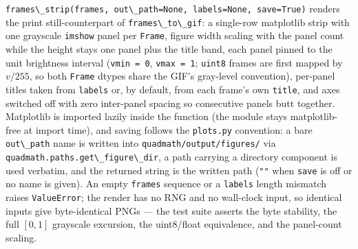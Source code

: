 \documentclass[
  10pt,
]{article}
\newcommand{\passthrough}[1]{#1}
\begin{document}
\passthrough{\lstinline!frames\_strip(frames, out\_path=None, labels=None, save=True)!}
renders the print still-counterpart of
\passthrough{\lstinline!frames\_to\_gif!}: a single-row matplotlib strip
with one grayscale \passthrough{\lstinline!imshow!} panel per
\passthrough{\lstinline!Frame!}, figure width scaling with the panel
count while the height stays one panel plus the title band, each panel
pinned to the unit brightness interval
(\passthrough{\lstinline!vmin = 0!}, \passthrough{\lstinline!vmax = 1!};
\passthrough{\lstinline!uint8!} frames are first mapped by \(v/255\), so
both \passthrough{\lstinline!Frame!} dtypes share the GIF's gray-level
convention), per-panel titles taken from
\passthrough{\lstinline!labels!} or, by default, from each frame's own
\passthrough{\lstinline!title!}, and axes switched off with zero
inter-panel spacing so consecutive panels butt together. Matplotlib is
imported lazily inside the function (the module stays matplotlib-free at
import time), and saving follows the \passthrough{\lstinline!plots.py!}
convention: a bare \passthrough{\lstinline!out\_path!} name is written
into \passthrough{\lstinline!quadmath/output/figures/!} via
\passthrough{\lstinline!quadmath.paths.get\_figure\_dir!}, a path
carrying a directory component is used verbatim, and the returned string
is the written path (\passthrough{\lstinline!""!} when
\passthrough{\lstinline!save!} is off or no name is given). An empty
\passthrough{\lstinline!frames!} sequence or a
\passthrough{\lstinline!labels!} length mismatch raises
\passthrough{\lstinline!ValueError!}; the render has no RNG and no
wall-clock input, so identical inputs give byte-identical PNGs --- the
test suite asserts the byte stability, the full \([0, 1]\) grayscale
excursion, the uint8/float equivalence, and the panel-count scaling.
\end{document}
